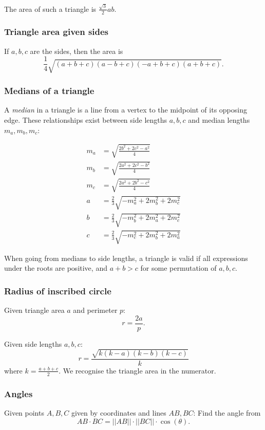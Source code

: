 \documentclass[a4paper,11pt]{article}
\begin{document}
The area of such a triangle is $\frac{\sqrt{3}}{2}ab$.

\subsubsection{Triangle area given sides}

If $a,b,c$ are the sides, then the area is $$\frac{1}{4}\sqrt{(a+b+c)(a-b+c)(-a+b+c)(a+b+c)}.$$

\subsubsection{Medians of a triangle}

A \emph{median} in a triangle is a line from a vertex to the midpoint of its opposing edge. These relationships exist between side lengths $a,b,c$ and median lengths $m_a,m_b,m_c$:

\begin{align*}
	m_a &= \sqrt{\frac{2b^2+2c^2-a^2}{4}}\\
	m_b &= \sqrt{\frac{2a^2+2c^2-b^2}{4}}\\
	m_c &= \sqrt{\frac{2a^2+2b^2-c^2}{4}}\\
	a &= \frac{2}{3}\sqrt{-m_a^2 + 2m_b^2 + 2m_c^2} \\
	b &= \frac{2}{3}\sqrt{-m_b^2 + 2m_a^2 + 2m_c^2} \\
	c &= \frac{2}{3}\sqrt{-m_c^2 + 2m_b^2 + 2m_a^2}
\end{align*}

When going from medians to side lengths, a triangle is valid if all expressions under the roots are positive, and $a+b>c$ for some permutation of $a,b,c$.

\subsubsection{Radius of inscribed circle}

Given triangle area $a$ and perimeter $p$: $$r=\frac{2a}{p}.$$

Given side lengths $a,b,c$:
$$r=\frac{\sqrt{k(k-a)(k-b)(k-c)}}{k}$$ where $k=\frac{a+b+c}{2}$. We recognise the triangle area in the numerator.

\subsubsection{Angles}

Given points $A,B,C$ given by coordinates and lines $AB, BC$: Find the angle from $$AB\cdot BC = ||AB||\cdot||BC|| \cdot \cos(\theta).$$
\end{document}
